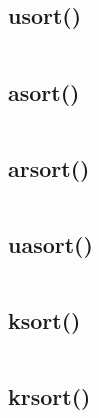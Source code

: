 \subsection{usort()}


\begin{lstlisting}[language=PHP]

\end{lstlisting}

\subsection{asort()}



\begin{lstlisting}[language=PHP]

\end{lstlisting}

\subsection{arsort()}

\begin{lstlisting}[language=PHP]

\end{lstlisting}

\subsection{uasort()}



\begin{lstlisting}[language=PHP]

\end{lstlisting}

\subsection{ksort()}



\begin{lstlisting}[language=PHP]

\end{lstlisting}


\subsection{krsort()}


\begin{lstlisting}[language=PHP]

\end{lstlisting}



